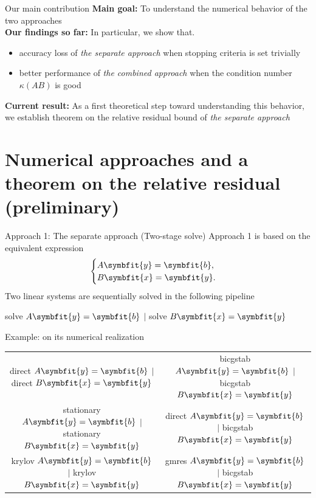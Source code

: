 \documentclass[aspectratio=169]{beamer}
\renewcommand{\bm}{\symbfit}
\begin{document}
\begin{frame}{Our main contribution}
	\textbf{Main goal:} To understand the numerical behavior of the two approaches\\
	\textbf{Our findings so far:} In particular, we show that.
		\begin{itemize}
			\item accuracy loss of \textit{the separate approach} when stopping criteria is set trivially
			\item better performance of \textit{the combined approach} when the condition number $\kappa(AB)$ is good
		\end{itemize}
		\textbf{Current result:} As a first theoretical step toward understanding this behavior, we establish theorem on the relative residual bound of \textit{the separate approach}
\end{frame}

\section{Numerical approaches and a theorem on the relative residual (preliminary)}
\begin{frame}{Approach 1: The separate approach (Two-stage solve)}
	Approach 1 is based on the equivalent expression
	\begin{equation}
	\begin{cases}
		A \bm{y} = \bm{b},\\
		B \bm{x} = \bm{y}.
	\end{cases}
	\end{equation}
Two linear systems are sequentially solved in the following pipeline
\begin{center}
solve $A \bm{y} = \bm{b}$ $|$ solve $B \bm{x} = \bm{y}$
\end{center}
\begin{block}{Example: on its numerical realization}
	\vspace{1pt}
	\begin{tabular}{c c}		
direct $A \bm{y} = \bm{b}$ $|$ direct $B \bm{x} = \bm{y}$ & bicgstab $A \bm{y} = \bm{b}$ $|$ bicgstab $B \bm{x} = \bm{y}$\\
stationary $A \bm{y} = \bm{b}$ $|$ stationary $B \bm{x} = \bm{y}$ & direct $A \bm{y} = \bm{b}$ $|$ bicgstab $B \bm{x} = \bm{y}$\\
krylov $A \bm{y} = \bm{b}$ $|$ krylov $B \bm{x} = \bm{y}$ & gmres $A \bm{y} = \bm{b}$ $|$ bicgstab $B \bm{x} = \bm{y}$
	\end{tabular}
\end{block}
\end{frame}
\end{document}
